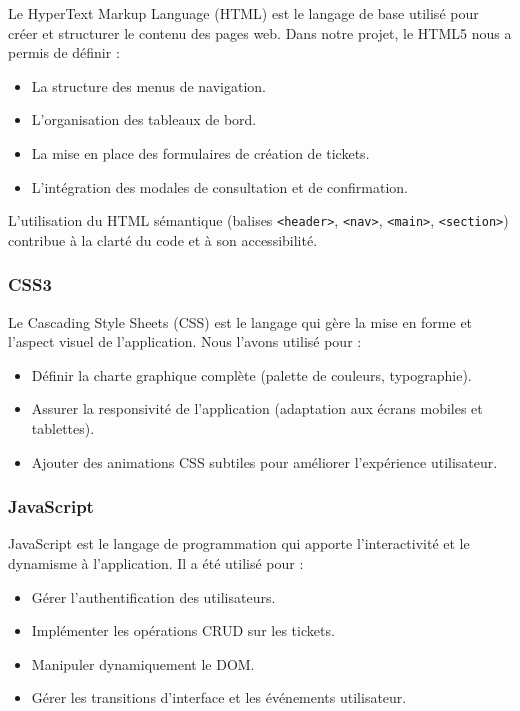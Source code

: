 \documentclass[12pt,a4paper,oneside]{report}
\begin{document}
Le HyperText Markup Language (HTML) est le langage de base utilisé pour créer et structurer le contenu des pages web. Dans notre projet, le HTML5 nous a permis de définir :
\begin{itemize}
    \item La structure des menus de navigation.
    \item L'organisation des tableaux de bord.
    \item La mise en place des formulaires de création de tickets.
    \item L'intégration des modales de consultation et de confirmation.
\end{itemize}

L'utilisation du HTML sémantique (balises \texttt{<header>}, \texttt{<nav>}, \texttt{<main>}, \texttt{<section>}) contribue à la clarté du code et à son accessibilité.

\subsubsection{CSS3}

Le Cascading Style Sheets (CSS) est le langage qui gère la mise en forme et l'aspect visuel de l'application. Nous l'avons utilisé pour :
\begin{itemize}
    \item Définir la charte graphique complète (palette de couleurs, typographie).
    \item Assurer la responsivité de l'application (adaptation aux écrans mobiles et tablettes).
    \item Ajouter des animations CSS subtiles pour améliorer l'expérience utilisateur.
\end{itemize}

\subsubsection{JavaScript}

JavaScript est le langage de programmation qui apporte l'interactivité et le dynamisme à l'application. Il a été utilisé pour :
\begin{itemize}
    \item Gérer l'authentification des utilisateurs.
    \item Implémenter les opérations CRUD sur les tickets.
    \item Manipuler dynamiquement le DOM.
    \item Gérer les transitions d'interface et les événements utilisateur.
\end{itemize}
\end{document}
